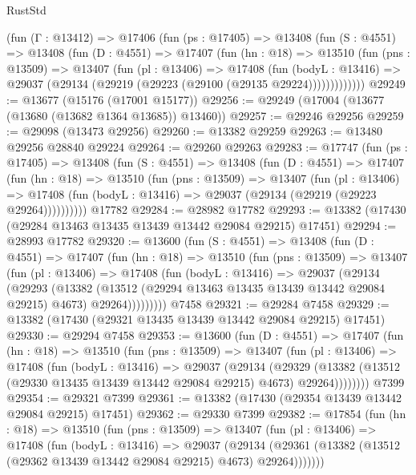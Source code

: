 \begin{lexlean}{RustStd}
\begin{coremodule}
    (fun (Γ : @13412) =>
    @17406
      (fun (ps : @17405) =>
      @13408
        (fun (S : @4551) =>
        @13408
          (fun (D : @4551) =>
          @17407
            (fun (hn : @18) =>
            @13510
              (fun (pns : @13509) =>
              @13407
                (fun (pl : @13406) =>
                @17408
                  (fun (bodyL : @13416) =>
                  @29037 (@29134 (@29219 (@29223 (@29100 (@29135 @29224)))))))))))))
@29249 := @13677 (@15176 (@17001 @15177))
@29256 := @29249 (@17004 (@13677 (@13680 (@13682 @1364 @13685)) @13460))
@29257 := @29246 @29256
@29259 := @29098 (@13473 @29256)
@29260 := @13382 @29259
@29263 := @13480 @29256 @28840 @29224
@29264 := @29260 @29263
@29283 := @17747
    (fun (ps : @17405) =>
    @13408
      (fun (S : @4551) =>
      @13408
        (fun (D : @4551) =>
        @17407
          (fun (hn : @18) =>
          @13510
            (fun (pns : @13509) =>
            @13407
              (fun (pl : @13406) =>
              @17408 (fun (bodyL : @13416) => @29037 (@29134 (@29219 (@29223 @29264))))))))))
    @17782
@29284 := @28982 @17782
@29293 := @13382 (@17430 (@29284 @13463 @13435 @13439 @13442 @29084 @29215) @17451)
@29294 := @28993 @17782
@29320 := @13600
    (fun (S : @4551) =>
    @13408
      (fun (D : @4551) =>
      @17407
        (fun (hn : @18) =>
        @13510
          (fun (pns : @13509) =>
          @13407
            (fun (pl : @13406) =>
            @17408
              (fun (bodyL : @13416) =>
              @29037
                (@29134
                  (@29293
                    (@13382
                      (@13512 (@29294 @13463 @13435 @13439 @13442 @29084 @29215) @4673)
                      @29264)))))))))
    @7458
@29321 := @29284 @7458
@29329 := @13382 (@17430 (@29321 @13435 @13439 @13442 @29084 @29215) @17451)
@29330 := @29294 @7458
@29353 := @13600
    (fun (D : @4551) =>
    @17407
      (fun (hn : @18) =>
      @13510
        (fun (pns : @13509) =>
        @13407
          (fun (pl : @13406) =>
          @17408
            (fun (bodyL : @13416) =>
            @29037
              (@29134
                (@29329
                  (@13382 (@13512 (@29330 @13435 @13439 @13442 @29084 @29215) @4673) @29264))))))))
    @7399
@29354 := @29321 @7399
@29361 := @13382 (@17430 (@29354 @13439 @13442 @29084 @29215) @17451)
@29362 := @29330 @7399
@29382 := @17854
    (fun (hn : @18) =>
    @13510
      (fun (pns : @13509) =>
      @13407
        (fun (pl : @13406) =>
        @17408
          (fun (bodyL : @13416) =>
          @29037
            (@29134
              (@29361 (@13382 (@13512 (@29362 @13439 @13442 @29084 @29215) @4673) @29264)))))))

\end{coremodule}
\end{lexlean}
